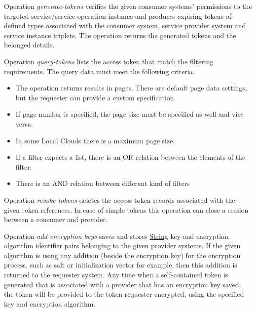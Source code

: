 \documentclass[a4paper]{arrowhead}
\newcommand{\pref}[1]{{\textcolor{ArrowheadGrey}{\hyperref[sec:model:primitives:#1]{#1}}}}
\begin{document}
Operation \textit{generate-tokens} verifies the given consumer systems' permissions to the targeted service/service-operation instance and produces expiring tokens of defined types associated with the consumer system, service provider system and  service instance triplets. The operation returns the generated tokens and the belonged details.


Operation \textit{query-tokens} lists the access token that match the filtering requirements. The query data must meet the following criteria.

\begin{itemize}
    \item The operation returns results in pages. There are default page data settings, but the requester can provide a custom specification.
    \item If page number is specified, the page size must be specified as well and vice versa.
    \item In some Local Clouds there is a maximum page size.
    \item If a filter expects a list, there is an OR relation between the elements of the filter.
    \item There is an AND relation between different kind of filters
\end{itemize}


Operation \textit{revoke-tokens} deletes the access token records associated with the given token references. In case of simple tokens this operation can close a session between a consumer and provider.


Operation \textit{add-encryption-keys} saves and stores \pref{String} key and encryption algorithm identifier pairs belonging to the given provider systems. If the given algorithm is using any addition (beside the encryption key) for the encryption process, such as salt or initialization vector for example, then this addition is returned to the requester system. Any time when a self-contained token is generated that is associated with a provider that has an encryption key saved, the token will be provided to the token requester encrypted, using the specified key and encryption algorithm.
\end{document}
